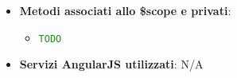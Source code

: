 \begin{itemize}
\begin{itemize}
					\end{itemize}

				\item \textbf{Metodi associati allo \$scope e privati}:
					\begin{itemize}
						\item \textcolor{forestgreen}{\texttt{TODO}}

					\end{itemize}

				\item \textbf{Servizi AngularJS utilizzati}: N/A

			\end{itemize}


